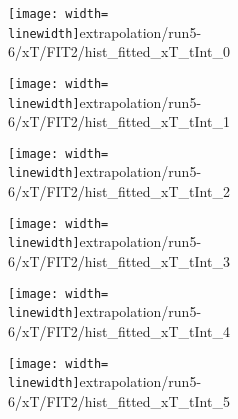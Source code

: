 \begin{figure}
\begin{subfigure}{0.45\linewidth}
\texttt{[image: width=\\linewidth]}{extrapolation/run5-6/xT/FIT2/hist_fitted_xT_tInt_0}
\end{subfigure}
\begin{subfigure}{0.45\linewidth}
\texttt{[image: width=\\linewidth]}{extrapolation/run5-6/xT/FIT2/hist_fitted_xT_tInt_1}
\end{subfigure}
\begin{subfigure}{0.45\linewidth}
\texttt{[image: width=\\linewidth]}{extrapolation/run5-6/xT/FIT2/hist_fitted_xT_tInt_2}
\end{subfigure}
\begin{subfigure}{0.45\linewidth}
\texttt{[image: width=\\linewidth]}{extrapolation/run5-6/xT/FIT2/hist_fitted_xT_tInt_3}
\end{subfigure}
\begin{subfigure}{0.45\linewidth}
\texttt{[image: width=\\linewidth]}{extrapolation/run5-6/xT/FIT2/hist_fitted_xT_tInt_4}
\end{subfigure}
\begin{subfigure}{0.45\linewidth}
\texttt{[image: width=\\linewidth]}{extrapolation/run5-6/xT/FIT2/hist_fitted_xT_tInt_5}
\end{subfigure}
\end{figure}
